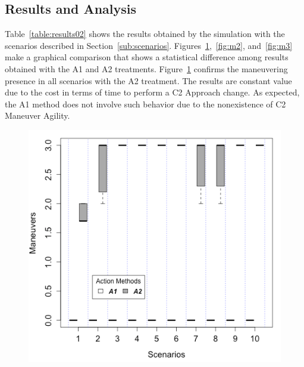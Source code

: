 \subsection{Results and Analysis}

Table~\ref{table:results02} shows the results obtained by the simulation with the scenarios described in Section~\ref{sub:scenarios}. Figures~\ref{fig:m1},~\ref{fig:m2}, and~\ref{fig:m3} make a graphical comparison that shows a statistical difference among results obtained with the A1 and A2 treatments. Figure~\ref{fig:m1} confirms the maneuvering presence in all scenarios with the A2 treatment. The results are constant value due to the cost in terms of time to perform a C2 Approach change. As expected, the A1 method does not involve such behavior due to the nonexistence of C2 Maneuver Agility.

\begin{figure}[ht]
\centering
\begin{minipage}{.5\textwidth}
    \centering
    \small
    \fontsize{7}{7}\selectfont
    \label{table:results02}
    
\end{minipage}%
\begin{minipage}{.5\textwidth}
  \centering
  \includegraphics[width=0.95\linewidth]{figures/graphs/Boxplot_M2.png}
  \label{fig:m1}
\end{minipage}
\end{figure}

